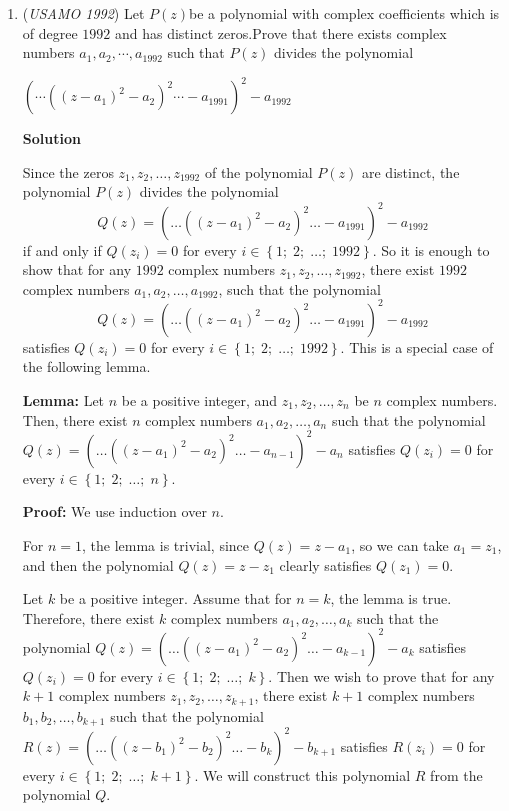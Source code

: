 \begin{enumerate}
 


	\item (\textit{USAMO 1992}) Let $P(z)$be a polynomial with complex coefficients which is of degree $1992$ and has distinct zeros.Prove that there exists complex numbers $a_1,a_2,\cdots,a_{1992}$ such that $P(z)$ divides the polynomial


 $\left(\cdots\left(\left(z-a_1\right)^2-a_2\right)^2\cdots-a_{1991}\right)^2-a_{1992}$




\textbf{Solution}

Since the zeros $z_{1}, z_{2}, \ldots, z_{1992}$ of the polynomial $P(z)$ are distinct, the polynomial $P(z)$ divides the polynomial 
 \[Q\left(z\right) = \left( \ldots \left( \left(z-a_{1}\right)^{2}-a_{2}\right)^{2}\ldots-a_{1991}\right)^{2}-a_{1992}\]if and only if $Q\left(z_{i}\right)=0$ for every $i\in\left\{1;\;2;\;\ldots;\;1992\right\}$. So it is enough to show that for any $1992$ complex numbers $z_{1}, z_{2}, \dots, z_{1992}$, there exist $1992$ complex numbers $a_{1}, a_{2}, \ldots, a_{1992}$, such that the polynomial 
 \[Q\left(z\right) = \left(\ldots\left( \left(z-a_{1}\right)^{2}-a_{2}\right)^{2}\ldots-a_{1991}\right)^{2}-a_{1992}\]satisfies $Q\left(z_{i}\right)=0$ for every $i\in\left\{1;\;2;\;\ldots;\;1992\right\}$. This is a special case of the following lemma.

 
\textbf{Lemma:} Let $n$ be a positive integer, and $z_{1}, z_{2}, \ldots, z_{n}$ be $n$ complex numbers. Then, there exist $n$ complex numbers $a_{1}, a_{2},\ldots, a_{n}$ such that the polynomial $Q\left(z\right) = \left( \ldots \left( \left(z-a_{1}\right)^{2}-a_{2}\right)^{2}\ldots-a_{n-1}\right)^{2}-a_{n}$ satisfies $Q\left(z_{i}\right)=0$ for every $i\in\left\{1;\;2;\;\ldots;\;n\right\}$.

 
\textbf{Proof:} We use induction over $n$.

 For $n = 1$, the lemma is trivial, since $Q\left(z\right)=z-a_{1}$, so we can take $a_{1}=z_{1}$, and then the polynomial $Q\left(z\right)=z-z_{1}$ clearly satisfies $Q\left(z_{1}\right)=0$.

 
Let $k$ be a positive integer. Assume that for $n = k$, the lemma is true. Therefore, there exist $k$ complex numbers $a_{1}, a_{2}, \ldots, a_{k}$ such that the polynomial $Q\left(z\right)=\left(\ldots\left( \left(z-a_{1}\right)^{2}-a_{2}\right)^{2}\ldots-a_{k-1}\right)^{2}-a_{k}$ satisfies $Q\left(z_{i}\right)=0$ for every $i\in\left\{1;\;2;\;\ldots;\;k\right\}$. Then we wish to prove that for any $k + 1$ complex numbers $z_{1}, z_{2}, \ldots, z_{k+1}$, there exist $k + 1$ complex numbers $b_{1}, b_{2}, \ldots, b_{k+1}$ such that the polynomial $R\left(z\right)=\left(\ldots\left( \left(z-b_{1}\right)^{2}-b_{2}\right)^{2}\ldots-b_{k}\right)^{2}-b_{k+1}$ satisfies $R\left(z_{i}\right)=0$ for every $i\in\left\{1;\;2;\;\ldots;\;k+1\right\}$. We will construct this polynomial $R$ from the polynomial $Q$.


\end{enumerate}
